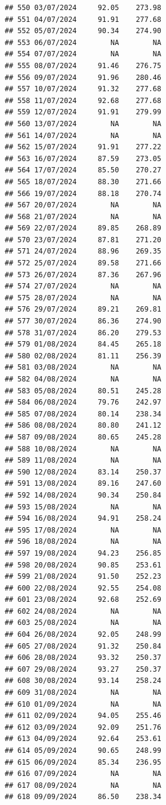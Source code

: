 \documentclass[
]{article}
\begin{document}
\begin{verbatim}
## 550 03/07/2024     92.05    273.98
## 551 04/07/2024     91.91    277.68
## 552 05/07/2024     90.34    274.90
## 553 06/07/2024        NA        NA
## 554 07/07/2024        NA        NA
## 555 08/07/2024     91.46    276.75
## 556 09/07/2024     91.96    280.46
## 557 10/07/2024     91.32    277.68
## 558 11/07/2024     92.68    277.68
## 559 12/07/2024     91.91    279.99
## 560 13/07/2024        NA        NA
## 561 14/07/2024        NA        NA
## 562 15/07/2024     91.91    277.22
## 563 16/07/2024     87.59    273.05
## 564 17/07/2024     85.50    270.27
## 565 18/07/2024     88.30    271.66
## 566 19/07/2024     88.18    270.74
## 567 20/07/2024        NA        NA
## 568 21/07/2024        NA        NA
## 569 22/07/2024     89.85    268.89
## 570 23/07/2024     87.81    271.20
## 571 24/07/2024     88.96    269.35
## 572 25/07/2024     89.58    271.66
## 573 26/07/2024     87.36    267.96
## 574 27/07/2024        NA        NA
## 575 28/07/2024        NA        NA
## 576 29/07/2024     89.21    269.81
## 577 30/07/2024     86.36    274.90
## 578 31/07/2024     86.20    279.53
## 579 01/08/2024     84.45    265.18
## 580 02/08/2024     81.11    256.39
## 581 03/08/2024        NA        NA
## 582 04/08/2024        NA        NA
## 583 05/08/2024     80.51    245.28
## 584 06/08/2024     79.76    242.97
## 585 07/08/2024     80.14    238.34
## 586 08/08/2024     80.80    241.12
## 587 09/08/2024     80.65    245.28
## 588 10/08/2024        NA        NA
## 589 11/08/2024        NA        NA
## 590 12/08/2024     83.14    250.37
## 591 13/08/2024     89.16    247.60
## 592 14/08/2024     90.34    250.84
## 593 15/08/2024        NA        NA
## 594 16/08/2024     94.91    258.24
## 595 17/08/2024        NA        NA
## 596 18/08/2024        NA        NA
## 597 19/08/2024     94.23    256.85
## 598 20/08/2024     90.85    253.61
## 599 21/08/2024     91.50    252.23
## 600 22/08/2024     92.55    254.08
## 601 23/08/2024     92.68    252.69
## 602 24/08/2024        NA        NA
## 603 25/08/2024        NA        NA
## 604 26/08/2024     92.05    248.99
## 605 27/08/2024     91.32    250.84
## 606 28/08/2024     93.32    250.37
## 607 29/08/2024     93.27    250.37
## 608 30/08/2024     93.14    258.24
## 609 31/08/2024        NA        NA
## 610 01/09/2024        NA        NA
## 611 02/09/2024     94.05    255.46
## 612 03/09/2024     92.09    251.76
## 613 04/09/2024     92.64    253.61
## 614 05/09/2024     90.65    248.99
## 615 06/09/2024     85.34    236.95
## 616 07/09/2024        NA        NA
## 617 08/09/2024        NA        NA
## 618 09/09/2024     86.50    238.34

\end{verbatim}
\end{document}
